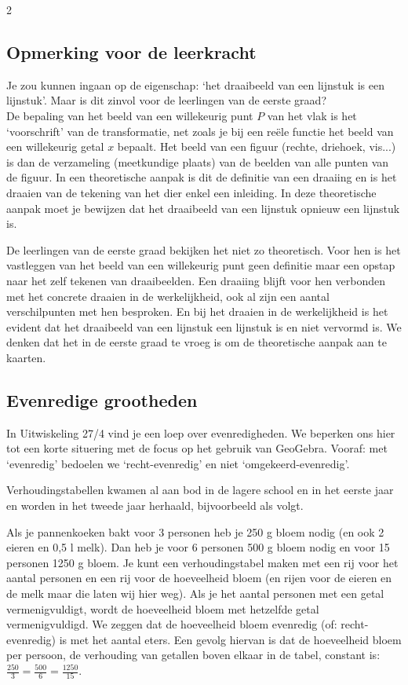 \begin{multicols}{2}

\subsection*{Opmerking voor de leerkracht}
 Je zou kunnen ingaan op de eigenschap: `het draaibeeld van een lijnstuk is een lijnstuk'. Maar is dit zinvol voor de leerlingen van de eerste graad?\\ 
 De bepaling van het beeld van een willekeurig punt $P$ van het vlak is het `voorschrift' van de transformatie, net zoals je bij een reële functie het beeld van een willekeurig getal $x$ bepaalt. Het beeld van een figuur (rechte, driehoek, vis...) is dan de verzameling (meetkundige plaats) van de beelden van alle punten van de figuur. In een theoretische aanpak is dit de definitie van een draaiing en is het draaien van de tekening van het dier enkel een inleiding. In deze theoretische aanpak moet je bewijzen dat het draaibeeld van een lijnstuk opnieuw een lijnstuk is. 

De leerlingen van de eerste graad bekijken het niet zo theoretisch. Voor hen is het vastleggen van het beeld van een willekeurig punt geen definitie maar een opstap naar het zelf tekenen van draaibeelden. Een draaiing blijft voor hen verbonden met het concrete draaien in de werkelijkheid, ook al zijn een aantal verschilpunten met hen besproken. En bij het draaien in de werkelijkheid is het evident dat het draaibeeld van een lijnstuk een lijnstuk is en niet vervormd is. We denken dat het in de eerste graad te vroeg is om de theoretische aanpak aan te kaarten.

\subsection{Evenredige grootheden}

In Uitwiskeling 27/4 vind je een loep over evenredigheden. We beperken ons hier tot een korte situering met de focus op het gebruik van GeoGebra. Vooraf: met `evenredig' bedoelen we `recht-evenredig' en niet `omgekeerd-evenredig'.

Verhoudingstabellen kwamen al aan bod in de lagere school en in het eerste jaar en worden in het tweede jaar herhaald, bijvoorbeeld als volgt. 

Als je pannenkoeken bakt voor 3 personen heb je 250 g bloem nodig (en ook 2 eieren en 0,5 l melk). Dan heb je voor 6 personen 500 g bloem nodig en voor 15 personen 1250 g bloem. Je kunt een verhoudingstabel maken met een rij voor het aantal personen en een rij voor de hoeveelheid bloem (en rijen voor de eieren en de melk maar die laten wij hier weg). Als je het aantal personen met een getal vermenigvuldigt, wordt de hoeveelheid bloem met hetzelfde getal vermenigvuldigd. We zeggen dat de hoeveelheid bloem evenredig (of: recht-evenredig) is met het aantal eters. Een gevolg hiervan is dat de hoeveelheid bloem per persoon, de verhouding van getallen boven elkaar in de tabel, constant is: $\displaystyle\frac{250}{3}=\frac{500}{6}=\frac{1250}{15}$.



\end{multicols}

